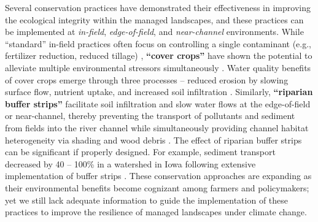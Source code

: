 \documentclass[12pt, class=article, crop=false]{standalone}
\begin{document}
Several conservation practices have demonstrated their effectiveness in improving the ecological integrity within the managed landscapes, and these practices can be implemented at \textit{in-field}, \textit{edge-of-field}, and \textit{near-channel} environments.
While ``standard'' in-field practices often focus on controlling a single contaminant (e.g., fertilizer reduction, reduced tillage) \citep{us_department_of_agriculture_natural_resources_conservation_service_effects_2017}, \textbf{``cover crops''} have shown the potential to alleviate multiple environmental stressors simultaneously \citep{blanco-canqui_cover_2018}.
Water quality benefits of cover crops emerge through three processes -- reduced erosion by slowing surface flow, nutrient uptake, and increased soil infiltration \citep{lenhart_agricultural_2017}.
Similarly, \textbf{``riparian buffer strips''} facilitate soil infiltration and slow water flows at the edge-of-field or near-channel, thereby preventing the transport of pollutants and sediment from fields into the river channel \citep{arora_herbicide_1996} while simultaneously providing channel habitat heterogeneity via shading \citep{nagasaka_influences_1999} and wood debris \citep{nagayama_fish_2010}.
The effect of riparian buffer strips can be significant if properly designed. For example, sediment transport decreased by 40 -- 100\% in a watershed in Iowa following extensive implementation of buffer strips \citep{arora_herbicide_1996}.
These conservation approaches are expanding as their environmental benefits become cognizant among farmers and policymakers; yet we still lack adequate information to guide the implementation of these practices to improve the resilience of managed landscapes under climate change.
\end{document}
